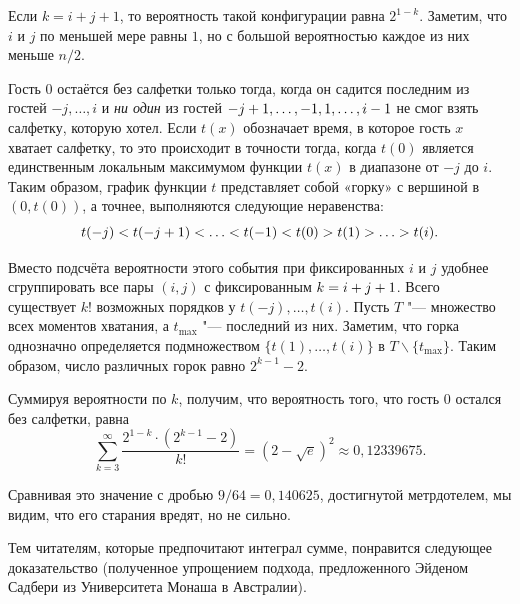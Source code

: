 \documentclass[twoside]{book}
\begin{document}
Если $k = i+j+1$, то вероятность такой конфигурации равна $2^{1-k}$.
Заметим, что $i$ и $j$ по меньшей мере равны $1$, но с большой вероятностью каждое из них меньше $n/2$.

Гость $0$ остаётся без салфетки только тогда, когда он садится последним из гостей $-j,\dots,i$ и \emph{ни один} из гостей $-j\z+1,\z\dots,-1,1,\dots,i-1$ не смог взять салфетку, которую хотел.
Если $t(x)$ обозначает время, в которое гость $x$ хватает салфетку, то это происходит в точности тогда, когда $t(0)$ является единственным локальным максимумом функции $t(x)$ в диапазоне от $-j$ до $i$.
Таким образом, график функции $t$ представляет собой «горку» с вершиной в $(0,t(0))$, 
а точнее, выполняются следующие неравенства: 
\[t(-j)\z<t(-j+1) \z<\z\dots\z<t(-1)\z<t(0)\z>t(1)\z>\z\dots\z>t(i).\]

Вместо подсчёта вероятности этого события при фиксированных $i$ и $j$ удобнее сгруппировать все пары $(i, j)$ с фиксированным $k=i\z+j+1$.
Всего существует $k!$ возможных порядков у $t(-j),\dots, t (i)$.
Пусть $T$ "--- множество всех моментов хватания, а $t_{{\max}}$ "--- последний из них. 
Заметим, что горка однозначно определяется подмножеством $\{t(1),\dots,t(i)\}$ в $T\backslash \{t_{{\max}}\}$.
Таким образом, число различных горок равно $2^{k-1}-2$.

Суммируя вероятности по $k$, получим, что вероятность того, что гость 0 остался без салфетки, равна
\[\sum_{k=3}^\infty\frac{2^{1-k}\cdot(2^{k-1}-2)}{k!}=(2-\sqrt{e})^2\approx 0{,}12339675.\]
\heartf

Сравнивая это значение с дробью $9/64 = 0{,}140625$, достигнутой метрдотелем, мы видим, что его старания вредят, но не сильно.

\medskip

Тем читателям, которые предпочитают интеграл сумме, понравится следующее доказательство (полученное упрощением подхода, предложенного Эйденом Садбери из Университета Монаша в Австралии).

\medskip
\end{document}
